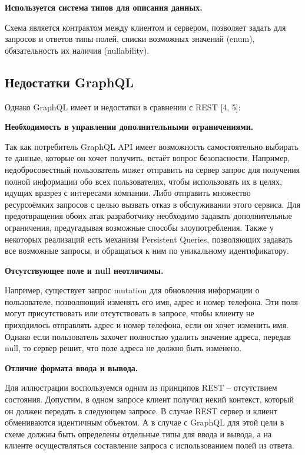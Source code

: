 \textbf{Используется система типов для описания данных.}

Схема является контрактом между клиентом и сервером, позволяет задать для запросов и ответов типы полей, списки возможных значений (enum), обязательность их наличия (nullability).

\subsection{Недостатки GraphQL}\label{subsec:graphql-disadvantages}

Однако GraphQL имеет и недостатки в сравнении с REST [4, 5]:

\textbf{Необходимость в управлении дополнительными ограничениями.}

Так как потребитель GraphQL API имеет возможность самостоятельно выбирать те данные, которые он хочет получить, встаёт вопрос безопасности.
Например, недобросовестный пользователь может отправить на сервер запрос для получения полной информации обо всех пользователях, чтобы использовать их в целях, идущих вразрез с интересами компании.
Либо отправить множество ресурсоёмких запросов с целью вызвать отказ в обслуживании этого сервиса.
Для предотвращения обоих атак разработчику необходимо задавать дополнительные ограничения, предугадывая возможные способы злоупотребления.
Также у некоторых реализаций есть механизм Persistent Queries, позволяющих задавать все возможные запросы, и обращаться к ним по уникальному идентификатору.

\textbf{Отсутствующее поле и null неотличимы.}

Например, существует запрос mutation для обновления информации о пользователе, позволяющий изменять его имя, адрес и номер телефона.
Эти поля могут присутствовать или отсутствовать в запросе, чтобы клиенту не приходилось отправлять адрес и номер телефона, если он хочет изменить имя.
Однако если пользователь захочет полностью удалить значение адреса, передав null, то сервер решит, что поле адреса не должно быть изменено.

\textbf{Отличие формата ввода и вывода.}

Для иллюстрации воспользуемся одним из принципов REST – отсутствием состояния.
Допустим, в одном запросе клиент получил некий контекст, который он должен передать в следующем запросе.
В случае REST сервер и клиент обмениваются идентичным объектом.
А в случае с GraphQL для этой цели в схеме должны быть определены отдельные типы для ввода и вывода, а на клиенте осуществляться составление запроса с использованием полей из ответа.

